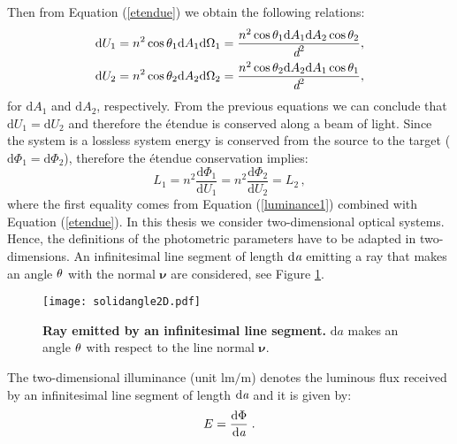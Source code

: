 Then from Equation (\ref{etendue}) we obtain the following relations: 
\begin{subequations}
\begin{align}
\textrm{d}U_1 &= n^2\cos\theta_1 \textrm{d}A_1\textrm{d}\Omega_1= \frac{n^2\cos\theta_1 \textrm{d}A_1\textrm{d}A_2\cos\theta_2}{\textit{d}^2},\\
\textrm{d}U_2 &= n^2 \cos\theta_2\textrm{d}A_2\textrm{d}\Omega_2= \frac{ n^2 \cos\theta_2\textrm{d}A_2\textrm{d}A_1\cos\theta_1}{\textit{d}^2}, \label{eq:dU2}
\end{align}
\end{subequations}
for $\textrm{d}A_1$ and $\textrm{d}A_2$, respectively.
From the previous equations we can conclude that $\textrm{d}U_1=\textrm{d}U_2$ and therefore the \'{e}tendue is conserved along a beam of light. 
Since the system is a lossless system energy is conserved from the source to the target ($\textrm{d}\Phi_1= \textrm{d}\Phi_2$), therefore the \'{e}tendue conservation implies:
\begin{equation}\label{basicluminance}
L_1 = n^2 \frac{\textrm{d}\Phi_1}{\textrm{d}U_1} = n^2 \frac{\textrm{d}\Phi_2}{\textrm{d}U_2} = L_2\,,
\end{equation}
where the first equality comes from Equation (\ref{luminance1}) combined with Equation (\ref{etendue}).
In this thesis we consider two-dimensional optical systems. 
 Hence, the definitions of the photometric parameters have to be adapted in two-dimensions. An infinitesimal line segment of length $\textrm{d}\textit{a}$ emitting a ray that makes an angle $\theta$ with the normal $\boldsymbol{\nu}$ are considered, see Figure \ref{fig:2Dsolidangle}. 
\begin{figure}[t]
 \label{fig:2Dsolidangle}
     \begin{center}
     \texttt{[image: solidangle2D.pdf]}
     \end{center}
     \caption{\textbf{Ray emitted by an infinitesimal line segment.} $\textrm{d}a$ makes an angle $\theta$ with respect to the line normal $\boldsymbol{\nu}$.}
\label{fig:2Dsolidangle}
 \end{figure}
The two-dimensional illuminance (unit $\textrm{lm}/\textrm{m}$) denotes the luminous flux received by an infinitesimal line segment of length $\textrm{d}\textit{a}$ 
and it is given by:
 \begin{equation}
 E=\frac{\textrm{d}\Phi}{\textrm{d}\textit{a}}\;.
 \end{equation}
